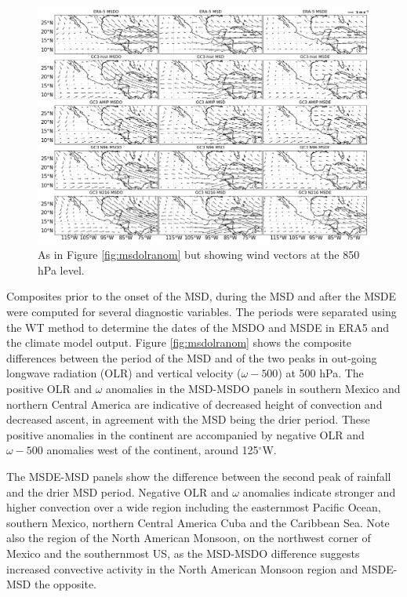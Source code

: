  \begin{figure}[t!]
\includegraphics[width=\linewidth]{figures/modcompar_dif2u3}
\caption{As in Figure \ref{fig:msdolranom} but showing wind vectors at the 850 hPa level. }
\label{fig:msduanom}
\end{figure}


Composites prior to the onset of the MSD, during the MSD and after the MSDE were computed for several diagnostic variables. The periods were separated using the WT method to determine the dates of the MSDO and MSDE in ERA5 and the climate model output.
Figure \ref{fig:msdolranom} shows the composite differences between the period of the MSD and of the two peaks in out-going longwave radiation (OLR) and vertical velocity ($\omega-500$) at 500 hPa.
The positive OLR and $\omega$ anomalies in the MSD-MSDO panels in southern Mexico and northern Central America are indicative of decreased height of convection and decreased ascent, in agreement with the MSD being the drier period. These positive anomalies in the continent are accompanied by negative OLR and $\omega-500$ anomalies west of the continent, around 125$^\circ$W. 


The MSDE-MSD panels show the difference between the second peak of rainfall and the drier MSD period. Negative OLR and $\omega$ anomalies indicate stronger and higher convection over a wide region including the easternmost Pacific Ocean, southern Mexico, northern Central America Cuba and the Caribbean Sea.  
Note also the region of the North American Monsoon, on the northwest corner of Mexico and the southernmost US, as the MSD-MSDO difference suggests increased convective activity in the North American Monsoon region and 
MSDE-MSD the opposite. 


